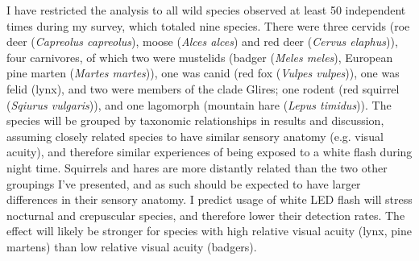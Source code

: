 I have restricted the analysis to all wild species observed at least 50 independent times during my survey, which totaled nine species.
There were three cervids (roe deer (\textit{Capreolus capreolus}), moose (\textit{Alces alces}) and red deer (\textit{Cervus elaphus})),
four carnivores, of which two were mustelids (badger (\textit{Meles meles}), European pine marten (\textit{Martes martes})), one was canid (red fox (\textit{Vulpes vulpes})), one was felid (lynx), 
and two were members of the clade Glires; one rodent (red squirrel (\textit{Sqiurus vulgaris})), and one lagomorph (mountain hare (\textit{Lepus timidus})).
The species will be grouped by taxonomic relationships in results and discussion, assuming closely related species to have similar sensory anatomy (e.g. visual acuity), and therefore similar experiences of being exposed to a white flash during night time. %
Squirrels and hares are more distantly related than the two other groupings I've presented, and as such should be expected to have larger differences in their sensory anatomy. 
I predict usage of white LED flash will stress nocturnal and crepuscular species, and therefore lower their detection rates. The effect will likely be stronger for species with high relative visual acuity (lynx, pine martens) than low relative visual acuity (badgers).










